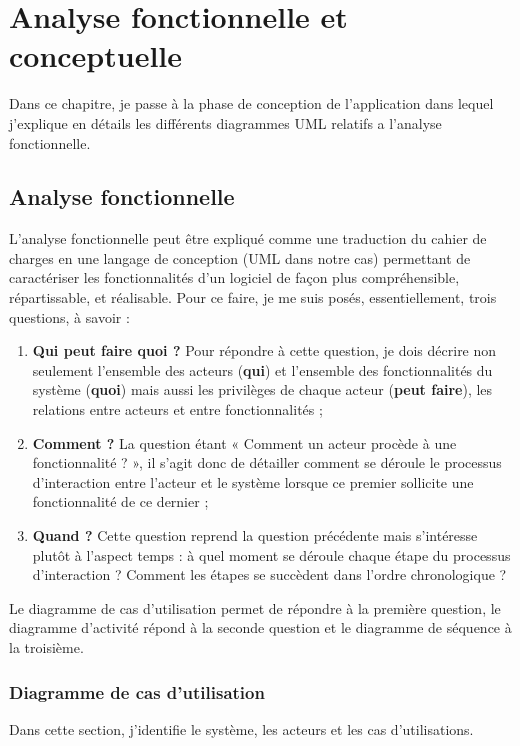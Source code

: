 \chapter{Analyse fonctionnelle et conceptuelle}
\label{sec:AnalyseFoncEtConcep}

Dans ce chapitre, je passe à la phase de conception de l'application dans lequel j'explique en détails les différents diagrammes UML relatifs a l'analyse fonctionnelle.

\section{Analyse fonctionnelle}
L'analyse fonctionnelle peut être expliqué comme une traduction du cahier de charges en une langage de conception (UML dans notre cas) permettant de caractériser les fonctionnalités d'un logiciel de façon plus compréhensible, répartissable, et réalisable. Pour ce faire, je me suis posés, essentiellement, trois questions, à savoir :
\begin{enumerate}
	\item \textbf{Qui peut faire quoi ?} Pour répondre à cette question, je dois décrire non seulement l’ensemble des acteurs (\textbf{qui}) et l'ensemble des fonctionnalités du système (\textbf{quoi}) mais aussi les privilèges de chaque acteur (\textbf{peut faire}), les relations entre acteurs et entre fonctionnalités ;
	
	\item \textbf{Comment ?} La question étant « Comment un acteur procède à une fonctionnalité ? », il s’agit donc de détailler comment se déroule le processus d’interaction entre l’acteur et le système lorsque ce premier sollicite une fonctionnalité de ce dernier ;
	
	\item \textbf{Quand ?} Cette question reprend la question précédente mais s’intéresse plutôt à l’aspect temps : à quel moment se déroule chaque étape du processus d’interaction ? Comment les étapes se succèdent dans l’ordre chronologique ?
	
\end{enumerate}

Le diagramme de cas d’utilisation permet de répondre à la première question, le diagramme d’activité répond à la seconde question et le diagramme de séquence à la troisième.

\subsection{Diagramme de cas d’utilisation}
Dans cette section, j'identifie le système, les acteurs et les cas d'utilisations.

